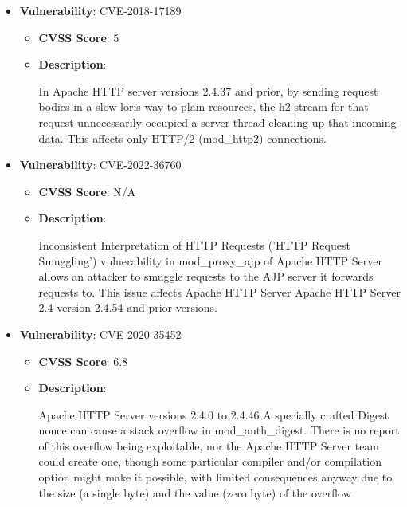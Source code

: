 \documentclass{article}
\begin{document}
\begin{itemize}
        \item \textbf{Vulnerability}: CVE-2018-17189
        \begin{itemize}
            \item \textbf{CVSS Score}:  5 
            \item \textbf{Description}:
            \parbox[t]{0.9\linewidth}{
                \ttfamily In Apache HTTP server versions 2.4.37 and prior, by sending request bodies in a slow loris way to plain resources, the h2 stream for that request unnecessarily occupied a server thread cleaning up that incoming data. This affects only HTTP/2 (mod\_http2) connections.
            }
        \end{itemize}
    
        \item \textbf{Vulnerability}: CVE-2022-36760
        \begin{itemize}
            \item \textbf{CVSS Score}:  N/A 
            \item \textbf{Description}:
            \parbox[t]{0.9\linewidth}{
                \ttfamily Inconsistent Interpretation of HTTP Requests ('HTTP Request Smuggling') vulnerability in mod\_proxy\_ajp of Apache HTTP Server allows an attacker to smuggle requests to the AJP server it forwards requests to.  This issue affects Apache HTTP Server Apache HTTP Server 2.4 version 2.4.54 and prior versions.
            }
        \end{itemize}
    
        \item \textbf{Vulnerability}: CVE-2020-35452
        \begin{itemize}
            \item \textbf{CVSS Score}:  6.8 
            \item \textbf{Description}:
            \parbox[t]{0.9\linewidth}{
                \ttfamily Apache HTTP Server versions 2.4.0 to 2.4.46 A specially crafted Digest nonce can cause a stack overflow in mod\_auth\_digest. There is no report of this overflow being exploitable, nor the Apache HTTP Server team could create one, though some particular compiler and/or compilation option might make it possible, with limited consequences anyway due to the size (a single byte) and the value (zero byte) of the overflow
            }
        \end{itemize}
    

\end{itemize}
\end{document}
